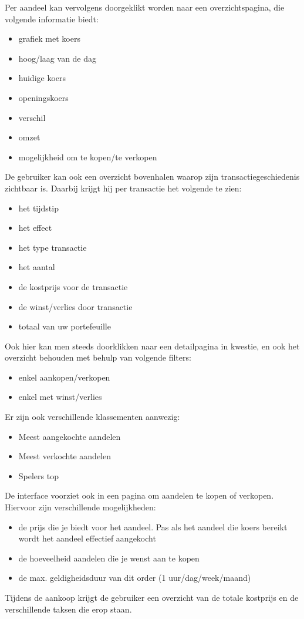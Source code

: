 Per aandeel kan vervolgens doorgeklikt worden naar een overzichtspagina, die volgende informatie biedt:
\begin{itemize}
\item{grafiek met koers}
\item{hoog/laag van de dag}
\item{huidige koers}
\item{openingskoers}
\item{verschil}
\item{omzet}
\item{mogelijkheid om te kopen/te verkopen}
\end{itemize}

De gebruiker kan ook een overzicht bovenhalen waarop zijn transactiegeschiedenis zichtbaar is. Daarbij krijgt hij per transactie het volgende te zien:
\begin{itemize}
\item{het tijdstip}
\item{het effect}
\item{het type transactie}
\item{het aantal}
\item{de kostprijs voor de transactie}
\item{de winst/verlies door transactie}
\item{totaal van uw portefeuille}
\end{itemize}
Ook hier kan men steeds doorklikken naar een detailpagina in kwestie, en ook het overzicht behouden met behulp van volgende filters:
\begin{itemize}
\item{enkel aankopen/verkopen}
\item{enkel met winst/verlies}
\end{itemize}

Er zijn ook verschillende klassementen aanwezig:
\begin{itemize}
\item{Meest aangekochte aandelen}
\item{Meest verkochte aandelen}
\item{Spelers top}
\end{itemize}

De interface voorziet ook in een pagina om aandelen te kopen of verkopen. Hiervoor zijn verschillende mogelijkheden:
\begin{itemize}
\item{de prijs die je biedt voor het aandeel. Pas als het aandeel die koers bereikt wordt het aandeel effectief aangekocht}
\item{de hoeveelheid aandelen die je wenst aan te kopen}
\item{de max. geldigheidsduur van dit order (1 uur/dag/week/maand)}
\end{itemize}
Tijdens de aankoop krijgt de gebruiker een overzicht van de totale kostprijs en de verschillende taksen die erop staan.


